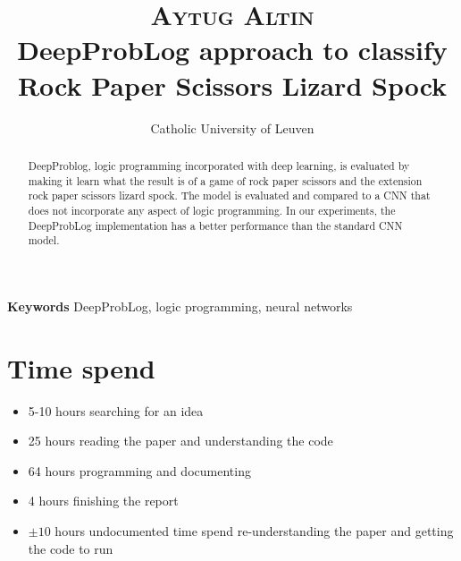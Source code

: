 \documentclass[10pt,letterpaper]{article}
\title{
		\usefont{OT1}{bch}{b}{n}
		\normalfont \normalsize \textsc{Aytug Altin} \\ [10pt]
		\huge  DeepProbLog approach to classify Rock Paper Scissors Lizard Spock\\
}
\author[0]{Catholic University of Leuven}
\begin{document}
\maketitle
{}

\begin{abstract}
	DeepProblog, logic programming incorporated with deep learning, is evaluated by making it learn what the result is of a game of rock paper scissors and the extension rock paper scissors lizard spock. The model is evaluated and compared to a CNN that does not incorporate any aspect of logic programming. In our experiments, the DeepProbLog implementation has a better performance than the standard CNN model.
\end{abstract}


{\textbf{Keywords}
DeepProbLog, logic programming, neural networks}








\section{Time spend}
\begin{itemize}
	\item 5-10 hours searching for an idea 
	\item 25 hours reading the paper and understanding the code
	\item 64 hours programming and documenting
	\item 4 hours finishing the report
	\item $\pm 10$ hours undocumented time spend re-understanding the paper and getting the code to run
\end{itemize}





{}
\end{document}
